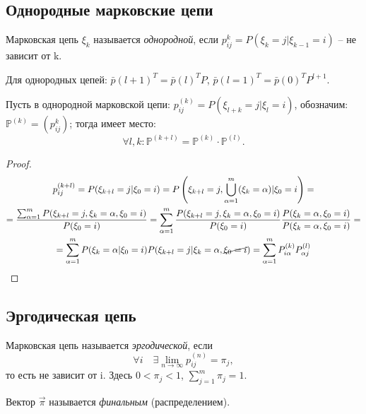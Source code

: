 \subsection{Однородные марковские цепи}

\begin{definition}
  Марковская цепь $\xi_k$ называется \emph{однородной}, если $p_{ij}^k = P(\xi_k=j | \xi_{k-1}=i)$ -- не
  зависит от k.
\end{definition}

Для однородных цепей: $\bar{p}(l+1)^T = \bar{p}(l)^T P$, $\bar{p}(l=1)^T = \bar{p}(0)^T P^{l+1}$.

\begin{theorem}
  Пусть в однородной марковской цепи: $p_{ij}^{(k)} = P(\xi_{l+k} = j | \xi_l=i)$, обозначим:
  $\mathbb{P}^{(k)} = (p_{ij}^k)$; тогда имеет место:
  \[
    \forall l, k : \mathbb{P}^{(k+l)} = \mathbb{P}^{(k)} \cdot \mathbb{P}^{(l)}.
  \]
\end{theorem}
\begin{proof}
  \begin{multline*}
    p_{ij}^{(k+l)} = P(\xi_{k+l}=j | \xi_0 = i)
    = P\left(\xi_{k+l}=j, \bigcup_{\alpha=1}^m (\xi_k=\alpha) | \xi_0 = i\right) = \\
    = \dfrac{\sum_{\alpha=1}^m P(\xi_{k+l} = j, \xi_k = \alpha, \xi_0=i)}{P(\xi_0=i)}
    = \sum_{\alpha=1}^m \dfrac{P(\xi_{k+l} = j, \xi_k = \alpha, \xi_0=i)}{P(\xi_0=i)} \dfrac{P(\xi_k=\alpha, \xi_0=i)}{P(\xi_k=\alpha, \xi_0=i)} = \\
    = \sum_{\alpha=1}^m P(\xi_k=\alpha|\xi_0=i) P(\xi_{k+l}=j | \xi_k = \alpha, \cancel{\xi_0=i})
    = \sum_{\alpha=1}^m P_{i\alpha}^{(k)} P_{\alpha j}^{(l)}
  \end{multline*}
\end{proof}

\subsection{Эргодическая цепь}

\begin{definition}
  Марковская цепь называется \emph{эргодической}, если
  \[
    \forall i \quad \exists \lim_{n\to\infty} p_{ij}^{(n)} = \pi_{j},
  \]
  то есть не зависит от i. Здесь $0 < \pi_j < 1$, $\sum_{j=1}^m \pi_j = 1$.

  Вектор $\vec{\pi}$ называется \emph{финальным} (распределением).
\end{definition}

